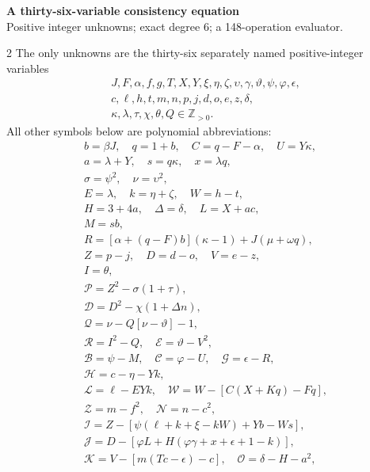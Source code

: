 \documentclass[10pt]{article}
\begin{document}
\begin{center}
{\large\bfseries A thirty-six-variable consistency equation}\\[-1pt]
{\small Positive integer unknowns; exact degree 6; a 148-operation evaluator.}
\end{center}\vspace{-8pt}
\begin{multicols}{2}
\fontsize{8.6}{9.1}\selectfont
The only unknowns are the thirty-six separately named positive-integer variables
\[
\begin{gathered}J,F,\alpha,f,g,T,X,Y,\xi,\eta,\zeta,\upsilon,\gamma,\vartheta,\psi,\varphi,\epsilon,\\
c,\ell,h,t,m,n,p,j,d,o,e,z,\delta,\\
\kappa,\lambda,\tau,\chi,\theta,Q\in\mathbb Z_{>0}.\end{gathered}
\]
All other symbols below are polynomial abbreviations:
\[
\begin{gathered}
b=\beta J,\quad q=1+b,\quad C=q-F-\alpha,\quad U=Y\kappa,\\
a=\lambda+Y,\quad s=q\kappa,\quad x=\lambda q,\\
\sigma=\psi^2,\quad\nu=\upsilon^2,\\
E=\lambda,\quad k=\eta+\zeta,\quad W=h-t,\\
H=3+4a,\quad\Delta=\delta,\quad L=X+ac,\\
M=sb,\\
R=[\alpha+(q-F)b](\kappa-1)+J(\mu+\omega q),\\
Z=p-j,\quad D=d-o,\quad V=e-z,\\
I=\theta,\\
\mathcal{P}=Z^2-\sigma(1+\tau),\\
\mathcal{D}=D^2-\chi(1+\Delta n),\\
\mathcal{Q}=\nu-Q[\nu-\vartheta]-1,\\
\mathcal{R}=I^2-Q,\quad \mathcal{E}=\vartheta-V^2,\\
\mathcal{B}=\psi-M,\quad \mathcal{C}=\varphi-U,\quad \mathcal{G}=\epsilon-R,\\
\mathcal{H}=c-\eta-Yk,\\
\mathcal{L}=\ell-EYk,\quad \mathcal{W}=W-[C(X+Kq)-Fq],\\
\mathcal{Z}=m-f^2,\quad \mathcal{N}=n-c^2,\\
\mathcal{I}=Z-[\psi(\ell+k+\xi-kW)+Yb-Ws],\\
\mathcal{J}=D-[\varphi L+H(\varphi\gamma+x+\epsilon+1-k)],\\
\mathcal{K}=V-[m(Tc-\epsilon)-c],\quad\mathcal{O}=\delta-H-a^2,\\

\end{gathered}\]
\end{multicols}
\end{document}
